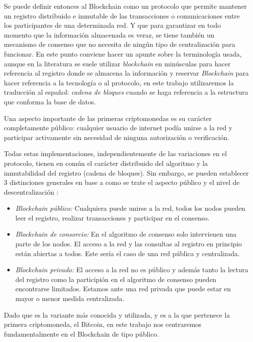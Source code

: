 Se puede definir entonces al Blockchain como un protocolo que permite mantener un registro distribuido e inmutable de las transacciones o comunicaciones entre los participantes de una determinada red. Y que para garantizar en todo momento que la información almacenada es veraz, se tiene también un mecanismo de consenso que no necesita de ningún tipo de centralización para funcionar. En este punto conviene hacer un apunte sobre la terminología usada, aunque en la literatura se suele utilizar \textit{blockchain} en minúsculas para hacer referencia al registro donde se almacena la información y reservar \textit{Blockchain} para hacer referencia a la tecnología o al protocolo, en este trabajo utilizaremos la traducción al español: \textit{cadena de bloques} cuando se haga referencia a la estructura que conforma la base de datos.

Una aspecto importante de las primeras criptomonedas es su carácter completamente público: cualquier usuario de internet podía unirse a la red y participar activamente sin necesidad de ninguna autorización o verificación. 

Todas estas implementaciones, independientemente de las variaciones en el protocolo, tienen en común el carácter distribuido del algoritmo y la inmutabilidad del registro (cadena de bloques). Sin embargo, se pueden establecer 3 distinciones generales en base a como se trate el aspecto público y el nivel de  descentralización \citep{type_blockchain}:
\begin{itemize}
\item \textit{Blockchain público:} Cualquiera puede unirse a la red, todos los nodos pueden leer el registro, realizar transacciones y participar en el consenso.
\item \textit{Blockchain de consorcio:} En el algoritmo de consenso solo intervienen una parte de los nodos. El acceso a la red y las consultas al registro en principio están abiertas a todos. Este sería el caso de una red pública y centralizada.
\item \textit{Blockchain privado:} El acceso a la red no es público y además tanto la lectura del registro como la participión en el algoritmo de consenso pueden encontrarse limitados. Estamos ante una red privada que puede estar en mayor o menor medida centralizada.
\end{itemize}

Dado que es la variante más conocida y utilizada, y es a la que pertenece la primera criptomoneda, el Bitcoin, en este trabajo nos centraremos fundamentalmente en el Blockchain de tipo público. 


